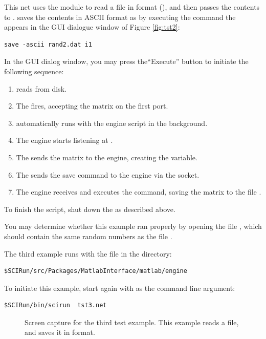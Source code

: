 This net uses the  module to read a file in \sr{}
format (), and then passes the contents to \m{}.  \m{}
saves the contents in ASCII format as  by executing the
command the appears in the \mlm{} GUI dialogue window of Figure
\ref{fig:tst2}:
%
\begin{verbatim}
save -ascii rand2.dat i1
\end{verbatim} 

In the \mlm{} GUI dialog window, you may press the``Execute'' button to
initiate the following sequence:
%
\begin{enumerate}
  \item {} reads  from disk.
  \item The \mlm{} fires, accepting the matrix on the first port.
  \item \m{} automatically runs with the engine script in the background.
  \item The engine starts listening at .
  \item The \mlm{} sends the matrix to the engine, creating the 
        variable. 
  \item The \mlm{} sends the save command to the engine via the
        socket. 
  \item The engine receives and executes the command, saving the matrix to
        the file . 
\end{enumerate}

To finish the script, shut down the \mlm{} as described above.

You may determine whether this example ran properly by opening the file
, which should contain the same random numbers as the
file .


The third \mlm{} example runs with the  file in the
directory:
%
\begin{verbatim}
$SCIRun/src/Packages/MatlabInterface/matlab/engine
\end{verbatim}

To initiate this example, start \sr{} again with  
as the
command line argument:
%
\begin{verbatim}
$SCIRun/bin/scirun  tst3.net
\end{verbatim}

\begin{figure}[htb]
  \begin{makeimage}
  \end{makeimage}
  \tstthree
  \caption{\label{fig:tst3} Screen capture for the third test 
example. This
  example reads a \m{} file, and saves it in \sr{} format. }
\end{figure}


